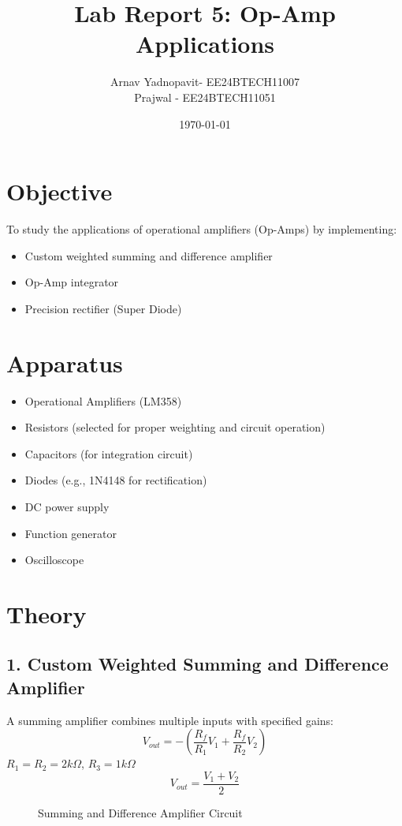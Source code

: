 \documentclass[a4paper,12pt]{article}
\title{Lab Report 5: Op-Amp Applications}
\author{Arnav Yadnopavit- EE24BTECH11007\\Prajwal - EE24BTECH11051}
\date{\today}
\begin{document}
\maketitle

\section*{Objective}
To study the applications of operational amplifiers (Op-Amps) by implementing:
\begin{itemize}
    \item Custom weighted summing and difference amplifier
    \item Op-Amp integrator
    \item Precision rectifier (Super Diode)
\end{itemize}

\section*{Apparatus}
\begin{itemize}
    \item Operational Amplifiers (LM358)
    \item Resistors (selected for proper weighting and circuit operation)
    \item Capacitors (for integration circuit)
    \item Diodes (e.g., 1N4148 for rectification)
    \item DC power supply
    \item Function generator
    \item Oscilloscope
\end{itemize}

\section*{Theory}
\subsection*{1. Custom Weighted Summing and Difference Amplifier}
A summing amplifier combines multiple inputs with specified gains:
\begin{equation}
V_{out} = -\left(\frac{R_f}{R_1}V_1 + \frac{R_f}{R_2}V_2 \right)
\end{equation}
$R_1=R_2=2k\Omega$, $R_3=1k\Omega$
\begin{equation}
V_{out} = \frac{V_1 + V_2}{2}
\end{equation}
\begin{figure}[H]
    \centering
    
    \caption{Summing and Difference Amplifier Circuit}
\end{figure}
\end{document}
